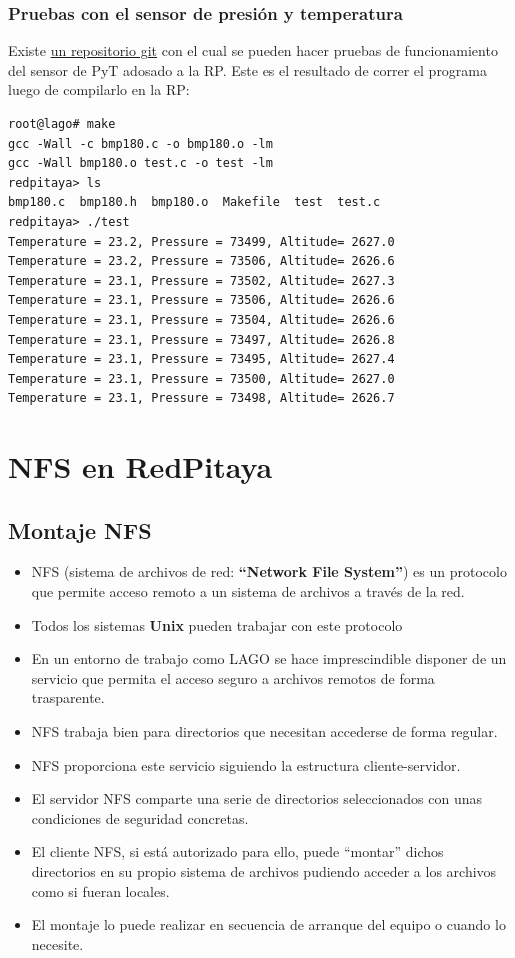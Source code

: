 \documentclass[a4paper,11pt]{article}
\begin{document}
\subsubsection{Pruebas con el sensor de presión y temperatura}
Existe \href{https://github.com/lagoprojectrp/rp\_bmp180}{un repositorio
git} con el cual se pueden hacer pruebas de funcionamiento del sensor de PyT
adosado a la RP. Este es el resultado de correr el programa luego de compilarlo
en la RP:
\begin{verbatim}
root@lago# make
gcc -Wall -c bmp180.c -o bmp180.o -lm
gcc -Wall bmp180.o test.c -o test -lm
redpitaya> ls
bmp180.c  bmp180.h  bmp180.o  Makefile  test  test.c
redpitaya> ./test
Temperature = 23.2, Pressure = 73499, Altitude= 2627.0
Temperature = 23.2, Pressure = 73506, Altitude= 2626.6
Temperature = 23.1, Pressure = 73502, Altitude= 2627.3
Temperature = 23.1, Pressure = 73506, Altitude= 2626.6
Temperature = 23.1, Pressure = 73504, Altitude= 2626.6
Temperature = 23.1, Pressure = 73497, Altitude= 2626.8
Temperature = 23.1, Pressure = 73495, Altitude= 2627.4
Temperature = 23.1, Pressure = 73500, Altitude= 2627.0
Temperature = 23.1, Pressure = 73498, Altitude= 2626.7
\end{verbatim}

\section{NFS en RedPitaya}
\subsection{Montaje NFS}
\begin{itemize}
  \item NFS (sistema de archivos de red: \textbf{``Network File System''}) es un
        protocolo que permite acceso remoto a un sistema de archivos a
        través de la red.
  \item Todos los sistemas \textbf{Unix} pueden trabajar con este protocolo
  \item En un entorno de trabajo como LAGO se hace imprescindible disponer de
        un servicio que permita el acceso seguro a archivos remotos de forma
        trasparente.
  \item NFS trabaja bien para directorios que necesitan accederse de
        forma regular.
  \item NFS proporciona este servicio siguiendo la estructura
        cliente-servidor.
  \item El servidor NFS comparte una serie de directorios
        seleccionados con unas condiciones de seguridad concretas.
  \item El cliente NFS, si está autorizado para ello, puede ``montar''
        dichos directorios en su propio sistema de archivos pudiendo acceder
        a los archivos como si fueran locales.
  \item El montaje lo puede realizar en secuencia de arranque del equipo o
        cuando lo necesite.
\end{itemize}
\end{document}
